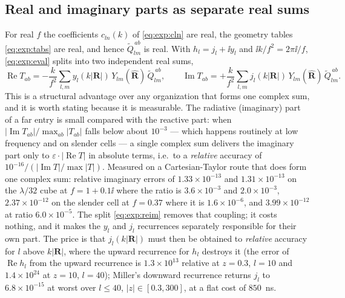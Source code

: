 \subsection{Real and imaginary parts as separate real sums}
\label{sec:exp:reim}

For real $f$ the coefficients $c_{ln}(k)$ of \eqref{eq:exp:cln} are real, the geometry
tables \eqref{eq:exp:tabs} are real, and hence $\widetilde{Q}^{\,ab}_{lm}$ is real. With
$h_l = j_l + \ii y_l$ and $\ii k/f^2 = 2\pi\ii/f$, \eqref{eq:exp:eval} splits into two
independent real sums,
\begin{equation}
\operatorname{Re}T_{ab} = -\frac{k}{f^2}\sum_{l,m} y_l(k|\mathbf{R}|)\,
Y_{lm}(\hat{\mathbf{R}})\,\widetilde{Q}^{\,ab}_{lm},
\qquad
\operatorname{Im}T_{ab} = +\frac{k}{f^2}\sum_{l,m} j_l(k|\mathbf{R}|)\,
Y_{lm}(\hat{\mathbf{R}})\,\widetilde{Q}^{\,ab}_{lm}.
\label{eq:exp:reim}
\end{equation}
This is a structural advantage over any organization that forms one complex sum, and it is
worth stating because it is measurable. The radiative (imaginary) part of a far entry is
small compared with the reactive part: when $|\operatorname{Im}T_{ab}|/\max_{ab}|T_{ab}|$
falls below about $10^{-3}$ --- which happens routinely at low frequency and on slender
cells --- a single complex sum delivers the imaginary part only to
$\varepsilon\cdot|\operatorname{Re}T|$ in absolute terms, i.e.\ to a \emph{relative}
accuracy of $10^{-16}/(|\operatorname{Im}T|/\max|T|)$. Measured on a Cartesian-Taylor
route that does form one complex sum: relative imaginary errors of
$1.33\times10^{-13}$ and $1.31\times10^{-13}$ on the $\lambda/32$ cube at $f = 1+0.1\ii$
where the ratio is $3.6\times10^{-3}$ and $2.0\times10^{-3}$,
$2.37\times10^{-12}$ on the slender cell at $f = 0.37$ where it is
$1.6\times10^{-6}$, and $3.99\times10^{-12}$ at ratio $6.0\times10^{-5}$. The split
\eqref{eq:exp:reim} removes that coupling; it costs nothing, and it makes the
$y_l$ and $j_l$ recurrences separately responsible for their own part. The price is that
$j_l(k|\mathbf{R}|)$ must then be obtained to \emph{relative} accuracy for $l$ above
$k|\mathbf{R}|$, where the upward recurrence for $h_l$ destroys it (the error of
$\operatorname{Re}h_l$ from the upward recurrence is $1.3\times10^{13}$ relative at
$z = 0.3$, $l = 10$ and $1.4\times10^{24}$ at $z = 10$, $l = 40$); Miller's downward
recurrence returns $j_l$ to $6.8\times10^{-15}$ at worst over
$l \le 40$, $|z| \in [0.3,300]$, at a flat cost of $850$~ns.
